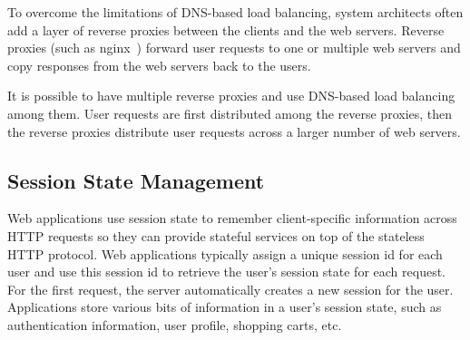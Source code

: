 To overcome the limitations of DNS-based load balancing, system architects often 
add a layer of reverse proxies between the clients and the web servers. 
Reverse proxies (such as nginx~\cite{nginx})  forward user requests to one or
multiple web servers and copy responses from the web servers back to the users.

It is possible to have multiple reverse proxies and use DNS-based load
balancing among them.  User requests are
first distributed among the reverse proxies, then  the reverse proxies
distribute user requests across a larger number of web servers.






\subsection{Session State Management}
\label{sec:sessionmanage}

Web applications use session state to remember client-specific information across HTTP requests
so they can provide stateful services on top of the stateless HTTP protocol.
Web applications typically assign a unique session id for each user and 
use this session id to retrieve the user's session state for each request.
For the first request, the server automatically creates a new session for the user.
Applications store various bits of information in a user's session state,
such as authentication information, user profile, shopping carts, etc.

